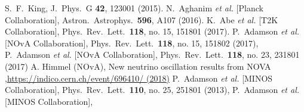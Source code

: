\documentclass[11pt]{article}
\providecommand{\xlink}[1]
  {\href{http://arxiv.org/abs/#1}{arXiv:#1}}
\begin{document}
\begin{thebibliography}{9}
  S.~F.~King,
  J.\ Phys.\ G {\bf 42}, 123001 (2015).
  N.~Aghanim {\it et al.} [Planck Collaboration],
  Astron.\ Astrophys.\  {\bf 596}, A107 (2016).
K.~Abe {\it et al.} [T2K Collaboration],
  Phys.\ Rev.\ Lett.\  {\bf 118}, no. 15, 151801 (2017).
  P.~Adamson {\it et al.} [NOvA Collaboration],
  Phys.\ Rev.\ Lett.\  {\bf 118}, no. 15, 151802 (2017),
 P.~Adamson {\it et al.} [NOvA Collaboration],
  Phys.\ Rev.\ Lett.\  {\bf 118}, no. 23, 231801 (2017)
 A. Himmel (NOvA),
New neutrino oscillation results from NOVA
,\url{https://indico.cern.ch/event/696410/
(2018)}
P.~Adamson {\it et al.} [MINOS Collaboration],
  Phys.\ Rev.\ Lett.\  {\bf 110}, no. 25, 251801 (2013),
    P.~Adamson {\it et al.} [MINOS Collaboration],

\end{thebibliography}
\end{document}
